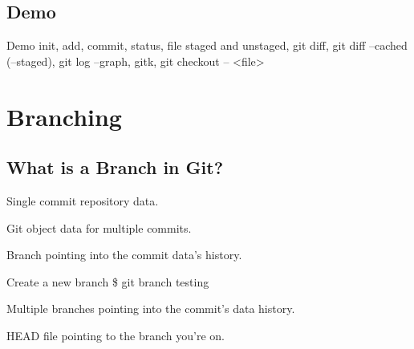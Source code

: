 \documentclass{beamer}
\begin{document}
\subsection{Demo}

\begin{frame}{Demo}
 init, add, commit, status, file staged and unstaged, git diff, git diff --cached (--staged), git log --graph, gitk, git checkout -- <file>
\end{frame}

\section{Branching}

\subsection{What is a Branch in Git?}

\begin{frame}{Single commit repository data.}
    \centering
    \hfill\vfill
\end{frame}

\begin{frame}{Git object data for multiple commits.}
    \centering
    \hfill\vfill
\end{frame}

\begin{frame}{Branch pointing into the commit data's history.}
    \centering
    \hfill\vfill
\end{frame}

\begin{frame}{Create a new branch}
  \$ git branch testing
\end{frame}

\begin{frame}{Multiple branches pointing into the commit's data history.}
    \centering
    \hfill\vfill
\end{frame}

\begin{frame}{HEAD file pointing to the branch you're on.}
    \centering
    \hfill\vfill
\end{frame}
\end{document}
